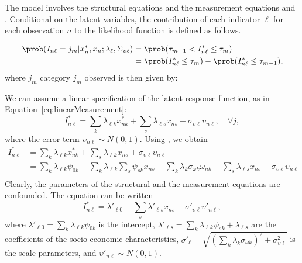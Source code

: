 \documentclass[12pt,a4paper]{article}
\begin{document}
The model involves the structural equations  and the measurement equations  and . Conditional on the latent variables, the contribution of each indicator $\ell$ for each observation $n$ to the likelihood function is defined as follows.

\begin{equation}
  \label{eq:discreteMeas-d}
  \begin{aligned}
    \prob(I_{n\ell} = j_m| x^*_n, x_n ; \lambda_\ell, \Sigma_{\upsilon \ell}) &= \prob(\tau_{m-1} < I^*_{n\ell} \leq \tau_m) \\
    &= \prob(I^*_{n\ell} \leq \tau_m) -  \prob(I^*_{n\ell} \leq \tau_{m-1}),
  \end{aligned}
\end{equation}
where $j_m$ category $j_m$ observed  is then given by:

We can assume a linear specification of the latent response function, as in
Equation~\eqref{eq:linearMeasurement}:
\begin{equation}
  \label{eq:measurement_latent}
I^*_{n\ell} = \sum_k \lambda_{\ell k}  x_{nk}^* + \sum_{s} \lambda_{\ell s} x_{ns} + \sigma_{\upsilon \ell} \upsilon_{n\ell}, \quad \forall j,
\end{equation}
where the error term $\upsilon_{n\ell} \sim N(0,1)$. Using , we obtain
\begin{align*}
  I^*_{n\ell} &= \sum_k \lambda_{\ell k}  x_{nk}^* + \sum_{s} \lambda_{\ell k} x_{ns} + \sigma_{\upsilon \ell} \upsilon_{n\ell} \\
  &= \sum_k \lambda_{\ell k}  \psi_{0k} + \sum_{k} \lambda_{\ell k} \sum_s \psi_{sk} x_{ns} + \sum_k \lambda_k \sigma_{\omega k} \omega_{nk} + \sum_{s} \lambda_{\ell s} x_{ns} + \sigma_{\upsilon \ell} \upsilon_{n\ell} \\
\end{align*}
Clearly, the parameters of the structural and the measurement equations are confounded. The equation can be written
\begin{equation}
I^*_{n\ell} = \lambda'_{\ell 0} + \sum_s \lambda'_{\ell s} x_{ns} + \sigma'_{\upsilon\ell} \upsilon'_{n \ell},
\end{equation}
where $\lambda'_{\ell 0} =\sum_k \lambda_{\ell k}  \psi_{0k}$ is the intercept, $\lambda'_{\ell s} =\sum_{k} \lambda_{\ell k} \psi_{sk}+\lambda_{\ell s}$ are the coefficients of the socio-economic characteristics, $\sigma'_{\ell}=\sqrt{(\sum_k \lambda_k \sigma_{\omega k})^2+\sigma^2_{\upsilon \ell}}$ is the scale parameters, and $\upsilon'_{n \ell}\sim N(0,1)$. 
\end{document}
